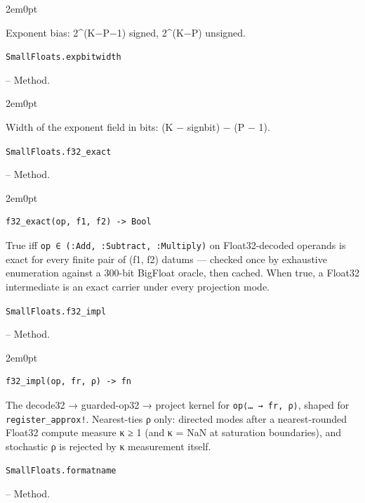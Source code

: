 \begin{adjustwidth}{2em}{0pt}

Exponent bias: 2{\textasciicircum}(K−P−1) signed, 2{\textasciicircum}(K−P) unsigned.



\end{adjustwidth}
\hypertarget{13856278338529021160}{\texttt{SmallFloats.expbitwidth}}  -- {Method.}

\begin{adjustwidth}{2em}{0pt}

Width of the exponent field in bits: (K − signbit) − (P − 1).



\end{adjustwidth}
\hypertarget{17243710630823570067}{\texttt{SmallFloats.f32\_exact}}  -- {Method.}

\begin{adjustwidth}{2em}{0pt}


\begin{verbatim}
f32_exact(op, f1, f2) -> Bool
\end{verbatim}

True iff \texttt{op ∈ (:Add, :Subtract, :Multiply)} on Float32-decoded operands is exact for every finite pair of (f1, f2) datums — checked once by exhaustive enumeration against a 300-bit BigFloat oracle, then cached. When true, a Float32 intermediate is an exact carrier under every projection mode.



\end{adjustwidth}
\hypertarget{9290299928136503291}{\texttt{SmallFloats.f32\_impl}}  -- {Method.}

\begin{adjustwidth}{2em}{0pt}


\begin{verbatim}
f32_impl(op, fr, ρ) -> fn
\end{verbatim}

The decode32 → guarded-op32 → project kernel for \texttt{op⟨… → fr, ρ⟩}, shaped for \texttt{register\_approx!}. Nearest-ties ρ only: directed modes after a nearest-rounded Float32 compute measure κ ≥ 1 (and κ = NaN at saturation boundaries), and stochastic ρ is rejected by κ measurement itself.



\end{adjustwidth}
\hypertarget{2286900636783861378}{\texttt{SmallFloats.formatname}}  -- {Method.}

